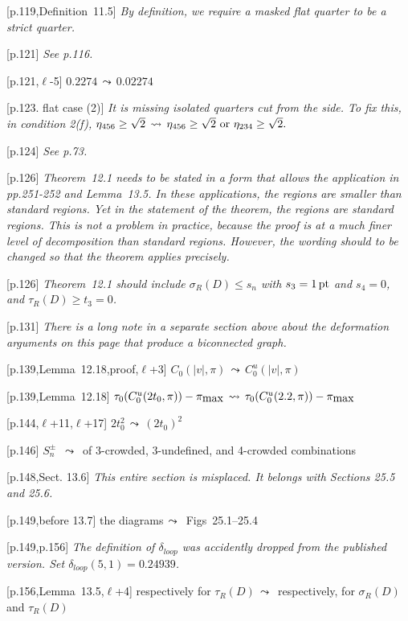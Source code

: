 \documentclass[11pt]{amsart}
\def\op#1{{\text{#1}}}
\def\lto{\ensuremath{\,\leadsto\,}}
\def\line{$\ell$}
\def\text{\hbox}
\def\sz{small} %
\begin{document}
\begin{\sz}
 
[p.119,Definition~11.5]  {\it By definition, we require a masked flat quarter to
be a strict quarter.}
	
[p.121] {\it See p.116.}

[p.121,\line-5]
	$
	0.2274 \lto 0.02274
	$


	
[p.123. flat case (2)]  {\it It is missing
isolated quarters cut from the side.
To fix this, in condition 2(f), }
	$
	\eta_{456}\ge\sqrt2 \lto
	\eta_{456}\ge\sqrt2 \text{ or } \eta_{234}\ge\sqrt2.
	$
	
[p.124] {\it See p.73. }
	
[p.126]  {\it Theorem~12.1 needs to be stated in
a form that allows the application in pp.251-252
and Lemma~13.5.  In these applications, the
regions are smaller than standard regions.
Yet in the statement of the theorem, the regions
are standard regions.  This is not a problem
in practice, because the proof is at a much
finer level of decomposition than standard regions.
However, the wording should to be changed so
that the theorem applies precisely.}


[p.126] 
{\it Theorem~12.1 should include $\sigma_R(D)\le s_n$
with $s_3 = 1\,\op{pt}$ and $s_4=0$, and
$\tau_R(D) \ge t_3 = 0$.}

[p.131] {\it There is a long note in a separate section above about
the deformation arguments on this page that produce a biconnected graph.}


[p.139,Lemma~12.18,proof,\line+3] 
	$C_0(|v|,\pi) \lto
	C_0^u(|v|,\pi)
	$
	
[p.139,Lemma~12.18] 
	$
	\tau_0(C_0^u(2t_0,\pi))-\pi_{\text{max}}\lto
	\tau_0(C_0^u(2.2,\pi))-\pi_{\text{max}}
	$

[p.144,\line+11,\line+17]
	$2t_0^2 \lto (2t_0)^2
	$

[p.146]
		$S_n^\pm$ \lto
	of 3-crowded, 3-undefined, and
	4-crowded combinations

[p.148,Sect. 13.6]  {\it This entire
section is misplaced.  It belongs with
Sections 25.5 and 25.6.}

[p.149,before 13.7]
the diagrams\lto
	Figs~25.1--25.4

[p.149,p.156] {\it The definition of $\delta_{loop}$ was accidently
dropped from the published version.  Set $\delta_{loop}(5,1)=0.24939$.
}

[p.156,Lemma~13.5,\line+4]
	respectively for $\tau_R(D)$\lto
	respectively, for $\sigma_R(D)$ and 
	$\tau_R(D)$ 


\end{\sz}
\end{document}

